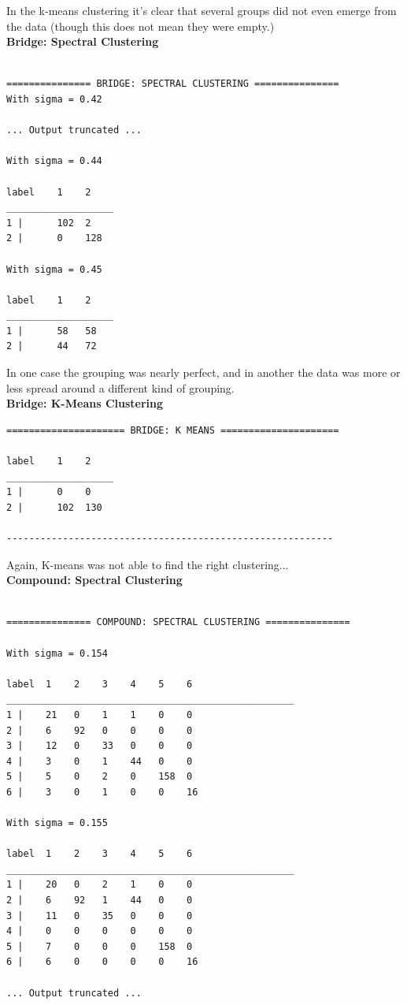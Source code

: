 \documentclass[11pt]{article}
\begin{document}
In the k-means clustering it's clear that several groups did not even emerge from the data (though this does not mean they were empty.)
\\[5pt]
\textbf{Bridge: Spectral Clustering} 
\begin{verbatim}

=============== BRIDGE: SPECTRAL CLUSTERING ===============
With sigma = 0.42

... Output truncated ... 	

With sigma = 0.44

label    1    2    
___________________
1 |      102  2    
2 |      0    128    

With sigma = 0.45

label    1    2    
___________________
1 |      58   58    
2 |      44   72    

\end{verbatim}
In one case the grouping was nearly perfect, and in another the data was more or less spread around a different kind of grouping.
\\[5pt]
\textbf{Bridge: K-Means Clustering} 
\begin{verbatim}
===================== BRIDGE: K MEANS =====================

label    1    2    
___________________
1 |      0    0    
2 |      102  130    

----------------------------------------------------------
\end{verbatim}
Again, K-means was not able to find the right clustering... 
\\[5pt]
\textbf{Compound: Spectral Clustering} 
\begin{verbatim}

=============== COMPOUND: SPECTRAL CLUSTERING ===============

With sigma = 0.154

label  1    2    3    4    5    6    
___________________________________________________
1 |    21   0    1    1    0    0    
2 |    6    92   0    0    0    0    
3 |    12   0    33   0    0    0    
4 |    3    0    1    44   0    0    
5 |    5    0    2    0    158  0    
6 |    3    0    1    0    0    16    

With sigma = 0.155

label  1    2    3    4    5    6    
___________________________________________________
1 |    20   0    2    1    0    0    
2 |    6    92   1    44   0    0    
3 |    11   0    35   0    0    0    
4 |    0    0    0    0    0    0    
5 |    7    0    0    0    158  0    
6 |    6    0    0    0    0    16    

... Output truncated ... 	

\end{verbatim}
\end{document}
